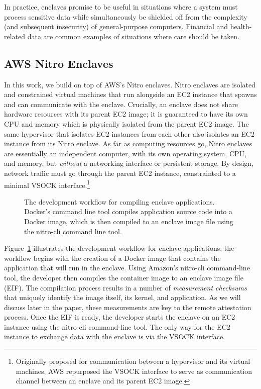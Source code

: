 In practice, enclaves promise to be useful in situations where a system must
process sensitive data while simultaneously be shielded off from the complexity
(and subsequent insecurity) of general-purpose computers. Financial and
health-related data are common examples of situations where care should be
taken.

\subsection{AWS Nitro Enclaves}
\label{sec:nitro}

In this work, we build on top of AWS's Nitro enclaves.  Nitro enclaves are
isolated and constrained virtual machines that run alongside an EC2 instance
that spawns and can communicate with the enclave.  Crucially, an enclave does
not share hardware resources with its parent EC2 image; it is guaranteed to
have its own CPU and memory which is physically isolated from the parent EC2
image.  The same hypervisor that isolates EC2 instances from each other also
isolates an EC2 instance from its Nitro enclave.  As far as computing resources
go, Nitro enclaves are essentially an independent computer, with its own
operating system, CPU, and memory, but \emph{without} a networking
interface or persistent storage.  By design, network traffic must go through the parent EC2 instance,
constrainted to a minimal VSOCK
interface.\footnote{Originally proposed for communication between a hypervisor
and its virtual machines, AWS repurposed the VSOCK interface to serve as
communication channel between an enclave and its parent EC2 image.}

\begin{figure}[t]
  \centering
  
  \caption{The development workflow for compiling enclave applications.
  Docker's command line tool compiles application source code into a Docker
  image, which is then compiled to an enclave image file using the nitro-cli
  command line tool.}
  \label{fig:dev-workflow}
\end{figure}

Figure~\ref{fig:dev-workflow} illustrates the development workflow for enclave
applications: the workflow begins with the creation of a Docker image that
contains the application that will run in the enclave.  Using Amazon's
nitro-cli command-line tool, the developer then compiles the container image to
an enclave image file (EIF).  The compilation process results in a number of
\emph{measurement checksums} that uniquely identify the image itself, its
kernel, and application.  As we will discuss later in the paper, these
measurements are key to the remote attestation process.
%
Once the EIF is ready, the developer starts the enclave on an EC2 instance
using the nitro-cli command-line tool.  The only way for the EC2 instance to
exchange data with the enclave is via the VSOCK interface.
